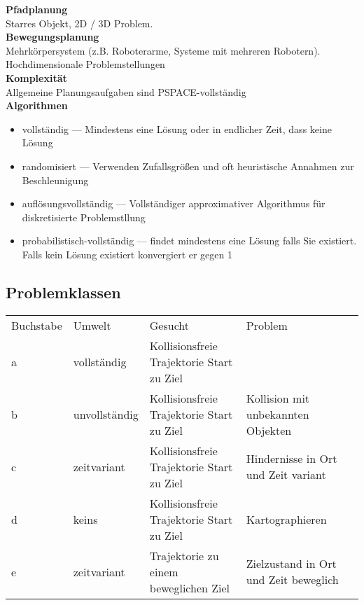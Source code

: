 \textbf{Pfadplanung}\\
Starres Objekt, 2D / 3D Problem.\\

\textbf{Bewegungsplanung}\\
Mehrkörpersystem (z.B. Roboterarme, Systeme mit mehreren Robotern).\\
Hochdimensionale Problemstellungen\\

\textbf{Komplexität}\\
Allgemeine Planungsaufgaben sind PSPACE-vollständig\\

\newpage
\textbf{Algorithmen}\\
\begin{itemize}
\item vollständig --- Mindestens eine Lösung oder in endlicher Zeit, dass keine Lösung
\item randomisiert --- Verwenden Zufallsgrößen und oft heuristische Annahmen zur Beschleunigung
\item auflösungsvollständig --- Vollständiger approximativer Algorithmus für diskretisierte Problemstllung
\item probabilistisch-vollständig --- findet mindestens eine Lösung falls Sie existiert. Falls kein Lösung existiert
  konvergiert er gegen 1
\end{itemize}

\subsection{Problemklassen}%
\label{bwp:sub:problemklassen}
\begin{tabular}{lllll}
  Buchstabe & Umwelt & Gesucht & Problem\\
  a & vollständig &  Kollisionsfreie Trajektorie Start zu Ziel & \\
  b & unvollständig & Kollisionsfreie Trajektorie Start zu Ziel & Kollision mit unbekannten Objekten\\
  c & zeitvariant &  Kollisionsfreie Trajektorie Start zu Ziel & Hindernisse in Ort und Zeit variant\\
  d & keins &  Kollisionsfreie Trajektorie Start zu Ziel & Kartographieren\\
  e & zeitvariant &  Trajektorie zu einem beweglichen Ziel & Zielzustand in Ort und Zeit beweglich\\
\end{tabular}

